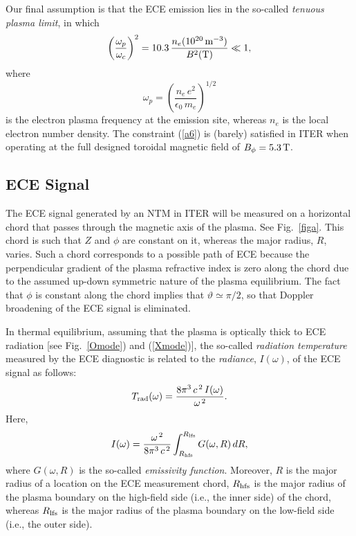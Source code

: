 \documentclass[12pt,prb,aps]{revtex4-1}
\begin{document}
Our final assumption is that the ECE emission lies in the so-called {\em tenuous plasma limit}, in which
\begin{equation}\label{a6}
\left(\frac{\omega_p}{\omega_c}\right)^2 = 10.3\,\frac{n_e(10^{20}\,{\rm m}^{-3})}{B^2({\rm T})}\ll 1,
\end{equation}
where
\begin{equation}
\omega_p = \left(\frac{n_e\,e^2}{\epsilon_0\,m_e}\right)^{1/2}
\end{equation}
is the electron plasma frequency at the emission site, whereas $n_e$ is the local electron number density. The constraint (\ref{a6}) is
(barely) satisfied in ITER when operating at the full designed toroidal magnetic field of $B_\phi= 5.3\,{\rm T}$. 

\subsection{ECE Signal}
The ECE signal generated by an NTM in ITER will be  measured on a horizontal chord that passes through the magnetic axis of the plasma. See Fig.~\ref{figa}. This chord
is such that $Z$ and $\phi$ are constant on it, whereas the major radius,  $R$, varies. Such a chord corresponds to a possible  path of ECE because 
the perpendicular gradient of the plasma refractive index is zero along the chord due to the assumed up-down symmetric nature of the plasma equilibrium. 
The fact that $\phi$
is constant along the chord implies that $\vartheta\simeq \pi/2$, so that Doppler
broadening of the ECE signal is eliminated.\cite{ece4a,ece5} 

In thermal equilibrium, assuming that the plasma is optically thick to ECE radiation [see Fig.~\ref{Omode}) and (\ref{Xmode})], the so-called {\em radiation temperature}\/ measured by the ECE diagnostic is related to the {\em radiance}, $I(\omega)$, of the ECE signal as follows:\,\cite{bornatici}
\begin{equation}\label{a8}
T_{\rm rad}(\omega)=\frac{8\pi^3\,c^{\,2}\, I(\omega)}{\omega^{\,2}}.
\end{equation}
Here,
\begin{equation}\label{a9}
I(\omega) = \frac{\omega^{\,2}}{8\pi^3\,c^{\,2}}\int_{R_{\rm hfs}}^{R_{\rm lfs}}G(\omega, R)\,dR,
\end{equation}
where $G(\omega,R)$ is the so-called {\em emissivity function}. Moreover, $R$ is the major radius of a location on the ECE measurement chord, $R_{\rm hfs}$ is the major radius
of the plasma boundary on the high-field side (i.e., the inner side) of the chord, whereas $R_{\rm lfs}$ is the major radius of the plasma boundary
on the low-field side (i.e., the outer side).
\end{document}

